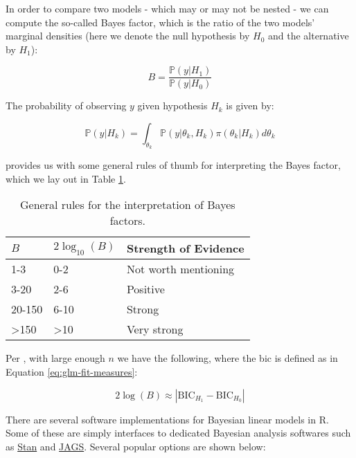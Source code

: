 \documentclass{report}
\begin{document}
In order to compare two models - which may or may not be nested - we can compute the so-called Bayes factor, which is the ratio of the two models' marginal densities (here we denote the null hypothesis by $H_0$ and the alternative by $H_1$):

\begin{equation}\label{eq:ols-bayes-bf-1}
    B = \frac{\mathbb{P}(y | H_1)}{\mathbb{P}(y | H_0)}
\end{equation}

The probability of observing $y$ given hypothesis $H_k$ is given by:

\begin{equation}\label{eq:ols-bayes-bf-2}
    \mathbb{P}(y | H_k) = \int_{\theta_k} \mathbb{P}(y | \theta_k, H_k) \pi(\theta_k | H_k) d\theta_k
\end{equation}

\cite{kass_bayes_1995} provides us with some general rules of thumb for interpreting the Bayes factor, which we lay out in Table \ref{table:bayes-factor}. 

\begin{table}[h!]
\centering
\begin{tabular}{||l l l||} 
 \hline
 $B$ & $2\log_{10}(B)$ & \textbf{Strength of Evidence} \\ [0.5ex] 
  \hline\hline
  1-3 & 0-2 & Not worth mentioning \\
  \hline
  3-20 & 2-6 & Positive \\
  \hline 
  20-150 & 6-10 & Strong \\
  \hline
  >150 & >10 & Very strong \\
  \hline
\end{tabular}
\caption{General rules for the interpretation of Bayes factors.}
\label{table:bayes-factor}
\end{table}

Per \cite[Chapter~10.1]{wakefield_bayesian_2013}, with large enough $n$ we have the following, where the \gls{bic} is defined as in Equation \ref{eq:glm-fit-measures}:

\begin{equation}\label{eq:ols-bayes-bf-3}
    2\log(B) \approx \left|\text{BIC}_{H_1} - \text{BIC}_{H_0}\right|
\end{equation}

There are several software implementations for Bayesian linear models in R. Some of these are simply interfaces to dedicated Bayesian analysis softwares such as \href{https://mc-stan.org}{Stan} and \href{https://mcmc-jags.sourceforge.io}{JAGS}. Several popular options are shown below:
\end{document}
